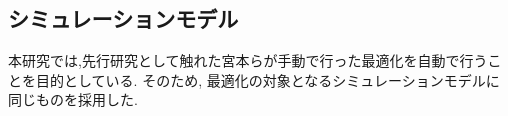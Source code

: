 \subsection{シミュレーションモデル}
本研究では,先行研究として触れた宮本\cite{miyamoto-master}\cite{miyamoto-master-eng}らが手動で行った最適化を自動で行うことを目的としている.
そのため, 最適化の対象となるシミュレーションモデルに同じものを採用した.



